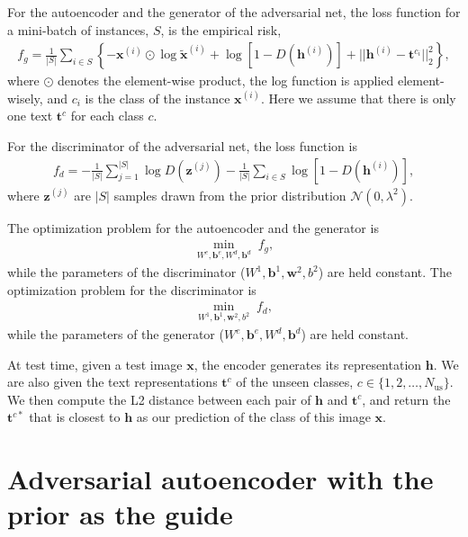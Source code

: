 \documentclass{article}
\newcommand{\bb}[1]{\boldsymbol{#1}}
\begin{document}
	For the autoencoder and the generator of the adversarial net, the loss function for a mini-batch of instances, $S$, is the empirical risk,
	\begin{align}
		f_g = \frac{1}{|S|} \sum_{i \in S} \left\{ -\bb{x}^{(i)} \odot \log \tilde{\bb{x}}^{(i)} + \log\left[ 1 - D( \bb{h}^{(i)} ) \right] + || \bb{h}^{(i)} - \bb{t}^{c_i} ||_2^2 \right\},
	\end{align}
	where $\odot$ denotes the element-wise product, the log function is applied element-wisely, and $c_i$ is the class of the instance $\bb{x}^{(i)}$. Here we assume that there is only one text $\bb{t}^c$ for each class $c$.

	For the discriminator of the adversarial net, the loss function is
	\begin{align}
		f_d = -\frac{1}{|S|} \sum_{j = 1}^{|S|} \log D( \bb{z}^{(j)} ) - \frac{1}{|S|} \sum_{i \in S} \log\left[ 1 - D( \bb{h}^{(i)} ) \right],
	\end{align}
	where $\bb{z}^{(j)}$ are $|S|$ samples drawn from the prior distribution $\mathcal{N}(0, \lambda^2)$.
	
	The optimization problem for the autoencoder and the generator is
	\begin{align}
		\min_{W^e, \bb{b}^e, W^d, \bb{b}^d} \; f_g,
	\end{align}
	while the parameters of the discriminator ($W^1, \bb{b}^1, \bb{w}^2, b^2$) are held constant. The optimization problem for the discriminator is
	\begin{align}
		\min_{W^1, \bb{b}^1, \bb{w}^2, b^2} \; f_d,
	\end{align}
	while the parameters of the generator ($W^e, \bb{b}^e, W^d, \bb{b}^d$) are held constant.

	At test time, given a test image $\bb{x}$, the encoder generates its representation $\bb{h}$. We are also given the text representations $\bb{t}^c$ of the unseen classes, $c \in \{ 1, 2, \dots, N_{\textrm{us}} \}$. We then compute the L2 distance between each pair of $\bb{h}$ and $\bb{t}^c$, and return the $\bb{t}^{c*}$ that is closest to $\bb{h}$ as our prediction of the class of this image $\bb{x}$.




\section{Adversarial autoencoder with the prior as the guide}
\end{document}

